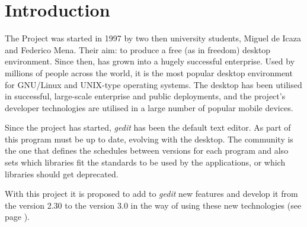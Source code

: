 
\chapter{Introduction}

The \GNOME Project was started in 1997 by two then university students, Miguel de Icaza and Federico Mena. Their aim: to produce a free (as in freedom) desktop environment. Since then, \GNOME has grown into a hugely successful enterprise. Used by millions of people across the world, it is the most popular desktop environment for GNU/Linux and UNIX-type operating systems. The desktop has been utilised in successful, large-scale enterprise and public deployments, and the project’s developer technologies are utilised in a large number of popular mobile devices\cite{website:gnome}.


Since the project has started, \emph{gedit} has been the default text editor. As part of \GNOME this program must be up to date, evolving with the desktop. The \GNOME community is the one that defines the schedules between versions for each program and also sets which libraries fit the standards to be used by the applications, or which libraries should get deprecated.

With this project it is proposed to add to \emph{gedit} new features and develop it from the version 2.30 to the version 3.0 in the way of using these new technologies (see page \pageref{chap:Technologies}).
